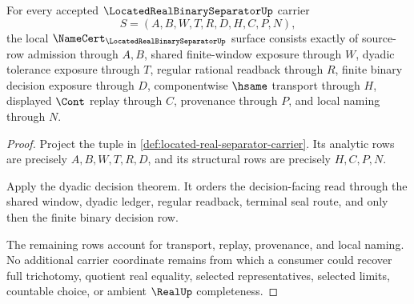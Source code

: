 \begin{theorem}
\label{thm:located-real-separator-namecert-obligations}
For every accepted $\LocatedRealBinarySeparatorUp$ carrier
$$
S=(A,B,W,T,R,D,H,C,P,N),
$$
the local $\NameCert_{\LocatedRealBinarySeparatorUp}$ surface consists exactly of source-row admission through $A,B$, shared finite-window exposure through $W$, dyadic tolerance exposure through $T$, regular rational readback through $R$, finite binary decision exposure through $D$, componentwise $\hsame$ transport through $H$, displayed $\Cont$ replay through $C$, provenance through $P$, and local naming through $N$.
\end{theorem}
\begin{proof}
Project the tuple in \autoref{def:located-real-separator-carrier}. Its analytic rows are precisely $A,B,W,T,R,D$, and its structural rows are precisely $H,C,P,N$.

Apply the dyadic decision theorem. It orders the decision-facing read through the shared window, dyadic ledger, regular readback, terminal seal route, and only then the finite binary decision row.

The remaining rows account for transport, replay, provenance, and local naming. No additional carrier coordinate remains from which a consumer could recover full trichotomy, quotient real equality, selected representatives, selected limits, countable choice, or ambient $\RealUp$ completeness.
\end{proof}


\begin{closurestatus}{\LocatedRealBinarySeparatorUp}
  \theoryclosure{\seedClosure}
  \formalstatus{\unformalizedV}
\end{closurestatus}
